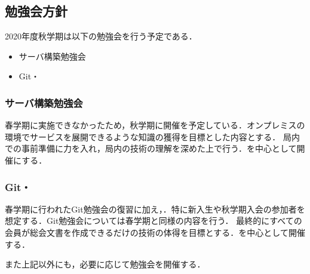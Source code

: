 \subsection*{勉強会方針}


2020年度秋学期は以下の勉強会を行う予定である．
\begin{itemize}
	\item サーバ構築勉強会
	\item Git・
\end{itemize}
	\subsubsection*{サーバ構築勉強会}
		春学期に実施できなかったため，秋学期に開催を予定している．オンプレミスの環境でサービスを展開できるような知識の獲得を目標とした内容とする．
		局内での事前準備に力を入れ，局内の技術の理解を深めた上で行う．\secondGrade{}を中心として開催にする．
	\subsubsection*{Git・}
 		春学期に行われたGit勉強会の復習に加え，．特に新入生や秋学期入会の参加者を想定する．Git勉強会については春学期と同様の内容を行う．
		最終的にすべての会員が総会文書を作成できるだけの技術の体得を目標とする．\secondGrade{}を中心として開催する．

また上記以外にも，必要に応じて勉強会を開催する．
